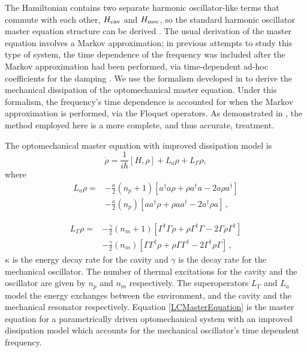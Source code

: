 \documentclass[reprint, amsmath,amssymb, aps,pra]{revtex4-1}
\begin{document}
The Hamiltonian contains two separate harmonic oscillator-like terms
that commute with each other, $H_{\rm cav}$ and $H_{\rm mec}$, so the
standard harmonic oscillator master equation structure can be derived
\cite{TesisMaestria}\cite{HanngiFM}. The usual derivation of the
master equation involves a Markov approximation; in previous attempts
to study this type of system, the time dependence of the frequency was
included after the Markov approximation had been performed, via
time-dependent ad-hoc coefficients for the damping \cite{BarberisLC}.
We use the formalism developed in \cite{HanngiFM} to derive the
mechanical dissipation of the optomechanical master equation. Under
this formalism, the frequency's time dependence is accounted for when the
Markov approximation is performed, via the Floquet operators. As
demonstrated in \cite{HanngiFM}, the method employed here is a more
complete, and thus accurate, treatment.

The optomechanical master equation with improved dissipation model is
\begin{equation} \label{LCMasterEquation}
\dot{\rho} = \frac{1}{i\hbar}[H,\rho] +L_a\rho + L_\Gamma \rho,
\end{equation}
where
\begin{align}
L_a \rho =& - \frac{\kappa}{2}(n_p + 1)[a^\dagger a\rho + \rho a^\dagger a -2a\rho a^\dagger]  \\
 &- \frac{\kappa}{2}(n_p)[ aa^\dagger\rho + \rho  aa^\dagger -2a^\dagger\rho a]\, ,\nonumber
\end{align}

\begin{align}\label{eq:mechanical_dissipation}
  L_\Gamma \rho =& - \frac{\gamma}{2}(n_m + 1)[\Gamma^\dagger \Gamma\rho + \rho \Gamma^\dagger \Gamma -2\Gamma\rho \Gamma^\dagger]  \\
                 &- \frac{\gamma}{2}(n_m)[ \Gamma\Gamma^\dagger\rho + \rho  \Gamma\Gamma^\dagger -2\Gamma^\dagger\rho \Gamma]\, ,\nonumber
\end{align} 
$\kappa$ is the energy decay rate for the cavity and $\gamma$ is the
decay rate for the mechanical oscillator. The number of thermal
excitations for the cavity and the oscillator are given by $n_p$ and
$n_m$ respectively. The superoperators $L_\Gamma$ and $L_a$ model the
energy exchanges between the environment, and the cavity and the
mechanical resonator respectively. Equation \eqref{LCMasterEquation}
is the master equation for a parametrically driven optomechanical
system with an improved dissipation model which accounts for the
mechanical oscillator's time dependent frequency. 
\end{document}
